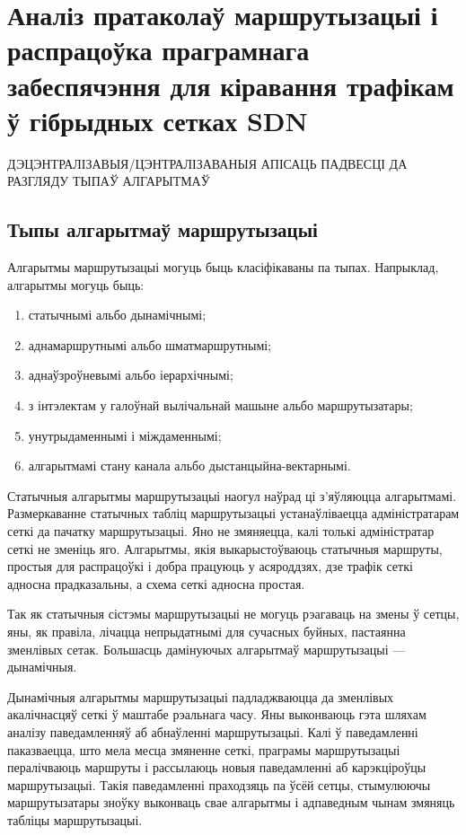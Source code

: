 \section{Аналіз пратаколаў маршрутызацыі і распрацоўка праграмнага забеспячэння для кіравання трафікам ў гібрыдных сетках SDN}

ДЭЦЭНТРАЛІЗАВЫЯ/ЦЭНТРАЛІЗАВАНЫЯ АПІСАЦЬ
ПАДВЕСЦІ ДА РАЗГЛЯДУ ТЫПАЎ АЛГАРЫТМАЎ

\subsection{Тыпы алгарытмаў маршрутызацыі}

Алгарытмы маршрутызацыі могуць быць класіфікаваны па тыпах.
Напрыклад, алгарытмы могуць быць:
\begin{enumerate}
    \item статычнымі альбо дынамічнымі;
    \item аднамаршрутнымі альбо шматмаршрутнымі;
    \item аднаўзроўневымі альбо іерархічнымі;
    \item з інтэлектам у галоўнай вылічальнай машыне альбо маршрутызатары;
    \item унутрыдаменнымі і міждаменнымі;
    \item алгарытмамі стану канала альбо дыстанцыйна-вектарнымі.
\end{enumerate}

Статычныя алгарытмы маршрутызацыі наогул наўрад ці з'яўляюцца
алгарытмамі.
Размеркаванне статычных табліц маршрутызацыі
устанаўліваецца адміністратарам сеткі да пачатку маршрутызацыі. Яно не
змяняецца, калі толькі адміністратар сеткі не зменіць яго. Алгарытмы,
якія выкарыстоўваюць статычныя маршруты, простыя для распрацоўкі і добра
працуюць у асяроддзях, дзе трафік сеткі адносна прадказальны, а схема
сеткі адносна простая.

Так як статычныя сістэмы маршрутызацыі не могуць рэагаваць на
змены ў сетцы, яны, як правіла, лічацца непрыдатнымі для сучасных
буйных, пастаянна зменлівых сетак. Большасць дамінуючых
алгарытмаў маршрутызацыі --- дынамічныя.

Дынамічныя алгарытмы маршрутызацыі падладжваюцца да зменлівых акалічнасцяў сеткі ў маштабе рэальнага часу. Яны выконваюць гэта шляхам аналізу паведамленняў аб абнаўленні маршрутызацыі. Калі ў паведамленні паказваецца, што мела месца змяненне сеткі, праграмы маршрутызацыі пералічваюць маршруты і рассылаюць новыя паведамленні аб карэкціроўцы маршрутызацыі. Такія паведамленні праходзяць па ўсёй сетцы, стымулюючы маршрутызатары зноўку выконваць свае алгарытмы і адпаведным чынам змяняць табліцы маршрутызацыі.


